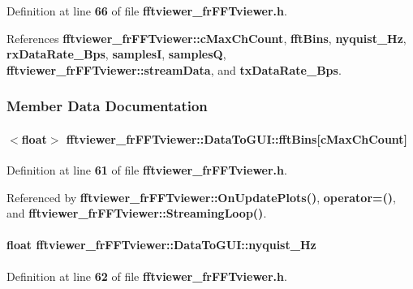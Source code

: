 Definition at line {\bf 66} of file {\bf fftviewer\+\_\+fr\+F\+F\+Tviewer.\+h}.



References {\bf fftviewer\+\_\+fr\+F\+F\+Tviewer\+::c\+Max\+Ch\+Count}, {\bf fft\+Bins}, {\bf nyquist\+\_\+\+Hz}, {\bf rx\+Data\+Rate\+\_\+\+Bps}, {\bf samplesI}, {\bf samplesQ}, {\bf fftviewer\+\_\+fr\+F\+F\+Tviewer\+::stream\+Data}, and {\bf tx\+Data\+Rate\+\_\+\+Bps}.



\subsubsection{Member Data Documentation}
\paragraph[{fft\+Bins}]{$<$float$>$ fftviewer\+\_\+fr\+F\+F\+Tviewer\+::\+Data\+To\+G\+U\+I\+::fft\+Bins[{\bf c\+Max\+Ch\+Count}]}\label{structfftviewer__frFFTviewer_1_1DataToGUI_a9b00b2d5442b4ed45c5bf987b150a442}


Definition at line {\bf 61} of file {\bf fftviewer\+\_\+fr\+F\+F\+Tviewer.\+h}.



Referenced by {\bf fftviewer\+\_\+fr\+F\+F\+Tviewer\+::\+On\+Update\+Plots()}, {\bf operator=()}, and {\bf fftviewer\+\_\+fr\+F\+F\+Tviewer\+::\+Streaming\+Loop()}.

\paragraph[{nyquist\+\_\+\+Hz}]{\setlength{\rightskip}{0pt plus 5cm}float fftviewer\+\_\+fr\+F\+F\+Tviewer\+::\+Data\+To\+G\+U\+I\+::nyquist\+\_\+\+Hz}\label{structfftviewer__frFFTviewer_1_1DataToGUI_a5a9cf8b85c63de4904f3bbc3ef590dff}


Definition at line {\bf 62} of file {\bf fftviewer\+\_\+fr\+F\+F\+Tviewer.\+h}.



